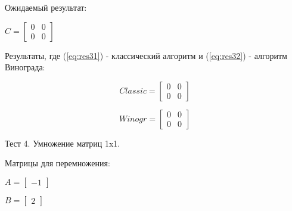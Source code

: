 \documentclass[12pt,a4paper]{scrartcl}
\begin{document}
	Ожидаемый результат:
	
	\begin{center}
		\begin{math}\label{eq:res3}
		C =\begin{bmatrix}
		0 & 0 \\
		0 & 0 
		\end{bmatrix}
		\end{math}
	\end{center}
	
	Результаты, где (\ref{eq:res31}) - классический алгоритм и (\ref{eq:res32}) - алгоритм Винограда:
	
	\begin{center}
		\begin{minipage}[c][3cm][c]{0,3\textwidth}
			\begin{equation}\label{eq:res31}
			Classic =\begin{bmatrix}
			0 & 0 \\
			0 & 0 
			\end{bmatrix}
			\end{equation}
		\end{minipage}	
		\begin{minipage}[c][3cm][c]{0,3\textwidth}
			\begin{equation}\label{eq:res32}
			Winogr =\begin{bmatrix}
			0 & 0 \\
			0 & 0 
			\end{bmatrix}
			\end{equation}
		\end{minipage}
	\end{center}
	
	Тест 4. Умножение матриц 1x1.
	
	Матрицы для перемножения:
	
	\begin{minipage}[c][3cm][c]{0,5\textwidth}
		\begin{math}\label{eq:test41}
		A =\begin{bmatrix}
		-1
		\end{bmatrix}
		\end{math}
	\end{minipage}
	\begin{minipage}[c][3cm][c]{0,5\textwidth}
		\begin{math}\label{eq:test42}
		B =\begin{bmatrix}
		2 
		\end{bmatrix}
		\end{math}
	\end{minipage}
	
\end{document}

